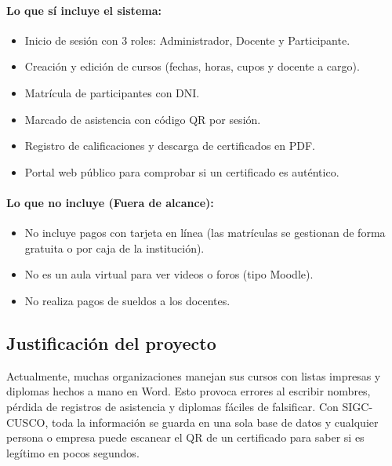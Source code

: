 \paragraph{Lo que sí incluye el sistema:}
\begin{itemize}[nosep]
    \item Inicio de sesión con 3 roles: Administrador, Docente y Participante.
    \item Creación y edición de cursos (fechas, horas, cupos y docente a cargo).
    \item Matrícula de participantes con DNI.
    \item Marcado de asistencia con código QR por sesión.
    \item Registro de calificaciones y descarga de certificados en PDF.
    \item Portal web público para comprobar si un certificado es auténtico.
\end{itemize}

\paragraph{Lo que no incluye (Fuera de alcance):}
\begin{itemize}[nosep]
    \item No incluye pagos con tarjeta en línea (las matrículas se gestionan de forma gratuita o por caja de la institución).
    \item No es un aula virtual para ver videos o foros (tipo Moodle).
    \item No realiza pagos de sueldos a los docentes.
\end{itemize}

\subsection{Justificación del proyecto}

Actualmente, muchas organizaciones manejan sus cursos con listas impresas y diplomas hechos a mano en Word. Esto provoca errores al escribir nombres, pérdida de registros de asistencia y diplomas fáciles de falsificar. Con SIGC-CUSCO, toda la información se guarda en una sola base de datos y cualquier persona o empresa puede escanear el QR de un certificado para saber si es legítimo en pocos segundos.
